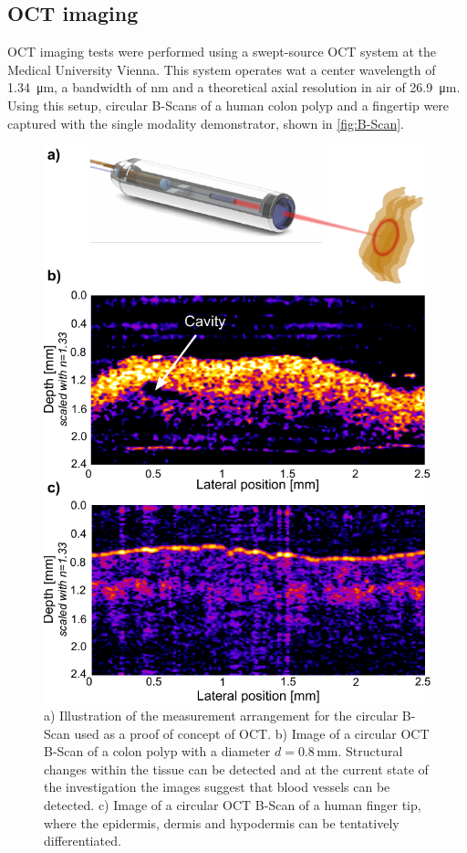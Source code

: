 \documentclass[10pt]{iopart}
\begin{document}
\subsection{OCT imaging}
OCT imaging tests were performed using a swept-source OCT system at the Medical University Vienna. This system operates wat a center wavelength of \SI{1.34}{\micro\meter}, a bandwidth of \unit[37]{nm} and a theoretical axial resolution in air of \SI{26.9}{\micro\meter}. Using this setup, circular B-Scans of a human colon polyp and a fingertip were captured with the single modality demonstrator, shown in \autoref{fig:B-Scan}. 

\begin{figure}[h!]\centering \includegraphics[width=\columnwidth]{figures/OCT_Measurement_arrangement}
      \caption{a) Illustration of the measurement arrangement for the circular B-Scan used as a proof of concept of OCT. b) Image of a circular OCT B-Scan of a colon polyp with a diameter $d=0.8\,\text{mm}$. Structural changes within the tissue can be detected and at the current state of the investigation the images suggest that blood vessels can be detected.
      c) Image of a circular OCT B-Scan of a human finger tip, where the epidermis, dermis and hypodermis can be tentatively differentiated.}
      \label{fig:B-Scan}
\end{figure}
\end{document}
